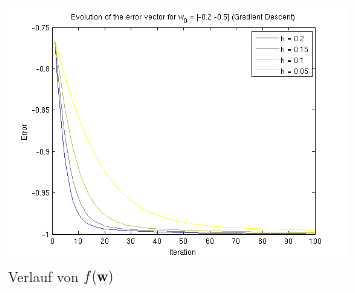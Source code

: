\begin{figure}[h!]
  \centering
  \includegraphics[width=0.8\textwidth]{./figures/211/error_w02.png}
  \caption{Verlauf von $f(\mathbf{w})$}
  \label{fig:error_w02}
\end{figure}
